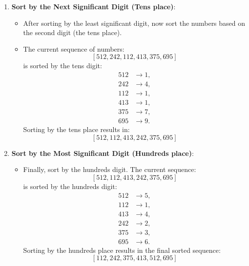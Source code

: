 \begin{example}
\begin{enumerate}
        \item \textbf{Sort by the Next Significant Digit (Tens place)}:
        \begin{itemize}
            \item After sorting by the least significant digit, now sort the numbers based on the second digit (the tens place).
            \item The current sequence of numbers:
            \[
            [512, 242, 112, 413, 375, 695]
            \]
            is sorted by the tens digit:
            \begin{align*}
            512 & \rightarrow 1, \\
            242 & \rightarrow 4, \\
            112 & \rightarrow 1, \\
            413 & \rightarrow 1, \\
            375 & \rightarrow 7, \\
            695 & \rightarrow 9.
            \end{align*}
            Sorting by the tens place results in:
            \[
            [512, 112, 413, 242, 375, 695]
            \]
        \end{itemize}
        
        \item \textbf{Sort by the Most Significant Digit (Hundreds place)}:
        \begin{itemize}
            \item Finally, sort by the hundreds digit. The current sequence:
            \[
            [512, 112, 413, 242, 375, 695]
            \]
            is sorted by the hundreds digit:
            \begin{align*}
            512 & \rightarrow 5, \\
            112 & \rightarrow 1, \\
            413 & \rightarrow 4, \\
            242 & \rightarrow 2, \\
            375 & \rightarrow 3, \\
            695 & \rightarrow 6.
            \end{align*}
            Sorting by the hundreds place results in the final sorted sequence:
            \[
            [112, 242, 375, 413, 512, 695]
            \]
        \end{itemize}
        
    \end{enumerate}

\end{example}

